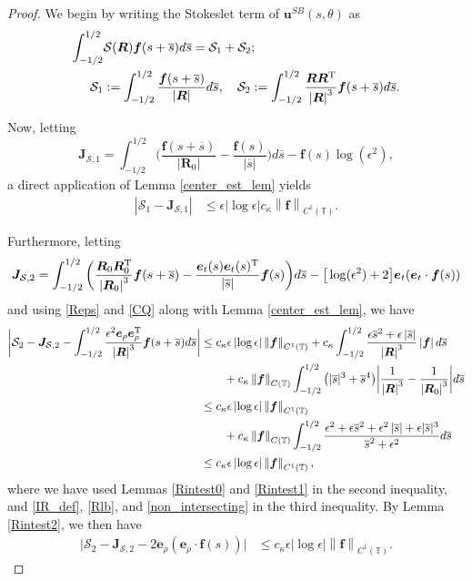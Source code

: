 \documentclass[11pt]{article}
\numberwithin{equation}{section}
\newcommand{\T}{\mathbb{T}}
\newcommand{\bars}{\overline s}
\newcommand{\bu}{\bm{u}}
\newcommand{\be}{\bm{e}}
\newcommand{\abs}[1]{\left\lvert #1 \right\rvert}
\newcommand{\norm}[1]{\left\lVert #1 \right\rVert}
\newcommand{\mc}[1]{\mathcal{#1}}
\theoremstyle{definition}
\begin{document}
\begin{proof}
We begin by writing the Stokeslet term of $\bu^{SB}(s,\theta)$ as
\begin{equation}
\begin{aligned}
\int_{-1/2}^{1/2}&\mc{S}(\bm{R})\bm{f}(s+\bars)d\bars = \mc{S}_1 + \mc{S}_2; \\
\mc{S}_1 &:= \int_{-1/2}^{1/2} \frac{\bm{f}(s+\bars)}{\abs{\bm{R}}} d\bars, \quad \mc{S}_2 := \int_{-1/2}^{1/2} \frac{\bm{R}\bm{R}^{\rm T}}{\abs{\bm{R}}^3} \bm{f}(s+\bars) d\bars.
\end{aligned}
\end{equation}

Now, letting 
\begin{equation}\label{cent_int1}
\bm{J}_{\mc{S},1} = \int_{-1/2}^{1/2} \bigg(\frac{ \bm{f}(s+\bars)}{\abs{\bm{R}_0}}- \frac{\bm{f}(s)}{\abs{\bars}} \bigg) d\bars - \bm{f}(s)\log(\epsilon^2),
\end{equation}
a direct application of Lemma \ref{center_est_lem} yields
\begin{align*}
\abs{\mc{S}_1 - \bm{J}_{\mc{S},1}} &\le \epsilon \abs{\log\epsilon}c_\kappa \norm{\bm{f}}_{C^1(\T)}.
\end{align*}

Furthermore, letting 
\begin{equation}\label{cent_int2}
\bm{J}_{\mc{S},2} = \int_{-1/2}^{1/2} \bigg(\frac{ \bm{R}_0\bm{R}_0^{\rm T}}{\abs{\bm{R}_0}^3}\bm{f}(s+\bars) - \frac{\be_t(s)\be_t(s)^{\rm T}}{\abs{\bars}}\bm{f}(s) \bigg) d\bars - \big[\log(\epsilon^2) + 2\big]\be_t(\be_t\cdot\bm{f}(s))
\end{equation}
and using \eqref{Reps} and \eqref{CQ} along with Lemma \ref{center_est_lem}, we have
 \begin{align*}
\bigg|\mc{S}_2- \bm{J}_{\mc{S},2} - \int_{-1/2}^{1/2} \frac{\epsilon^2\be_\rho\be_{\rho}^{\rm T}}{\abs{\bm{R}}^3} \bm{f}(s+\bars)d\bars \bigg|  &\le c_\kappa\epsilon\abs{\log\epsilon}\norm{\bm{f}}_{C^1(\T)} + c_\kappa\int_{-1/2}^{1/2} \frac{\epsilon\bars^2+\epsilon \abs{\bars}}{\abs{\bm{R}}^3}\abs{\bm{f}}d\bars \\
&\qquad + c_\kappa\norm{\bm{f}}_{C(\T)}\int_{-1/2}^{1/2} \big(|\bars|^3 +\bars^4 \big)\bigg|\frac{1}{\abs{\bm{R}}^3} - \frac{1}{\abs{\bm{R}_0}^3} \bigg| d\bars  \\
&\le c_\kappa\epsilon\abs{\log\epsilon}\norm{\bm{f}}_{C^1(\T)} \\
&\qquad + c_\kappa\norm{\bm{f}}_{C(\T)}\int_{-1/2}^{1/2}\frac{\epsilon^2+\epsilon\bars^2+ \epsilon^2\abs{\bars}+\epsilon|\bars|^3}{\bars^2+\epsilon^2} d\bars \\
&\le c_\kappa\epsilon\abs{\log\epsilon}\norm{\bm{f}}_{C^1(\T)},
\end{align*}
where we have used Lemmas \ref{Rintest0} and \ref{Rintest1} in the second inequality, and \eqref{IR_def}, \eqref{Rlb}, and \eqref{non_intersecting} in the third inequality. By Lemma \ref{Rintest2}, we then have
\begin{align*}
\big|\mc{S}_2- \bm{J}_{\mc{S},2} - 2\be_\rho(\be_{\rho}\cdot\bm{f}(s)) \big|  &\le c_\kappa\epsilon\abs{\log\epsilon}\norm{\bm{f}}_{C^1(\T)}.
\end{align*}


\end{proof}
\end{document}
